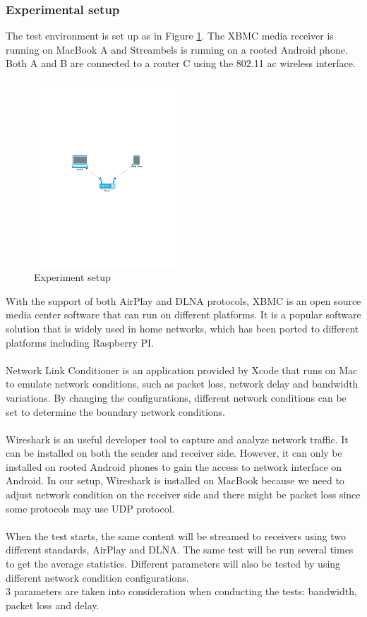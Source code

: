 \subsubsection{Experimental setup\label{3_7_1}}
The test environment is set up as in Figure \ref{setup}. The XBMC
media receiver is running on MacBook A and Streambels is running on a rooted Android phone. Both A and B are connected to a router C using the 802.11 ac wireless interface. \\
\begin{figure}[htb]
\centering \includegraphics[height=7cm]{charts/experiment_setup}
\caption{Experiment setup \label{setup}}
\end{figure}
With the support of both AirPlay and DLNA protocols, XBMC is an open source media center software that can run on different platforms. It is a popular software solution that is widely used in home networks, which has been ported to different platforms including Raspberry PI.\\
\\
Network Link Conditioner is an application provided by Xcode that runs on Mac to emulate network conditions, such as packet loss, network delay and bandwidth variations. By changing the configurations, different network conditions can be set to determine the boundary network conditions.\\
\\
Wireshark is an useful developer tool to capture and analyze network traffic. It can be installed on both the sender and receiver side. However, it can only be installed on rooted Android phones to gain the access to network interface on Android. In our setup, Wireshark is installed on MacBook because we need to adjust network condition on the receiver side and there might be packet loss since some protocols may use UDP protocol.\\
\\
When the test starts, the same content will be streamed to receivers using two different standards, AirPlay and DLNA. The same test will be run several times to get the average statistics. Different parameters will also be tested by using different network condition configurations.
\\
3 parameters are taken into consideration when conducting the tests: bandwidth, packet loss and delay. 
